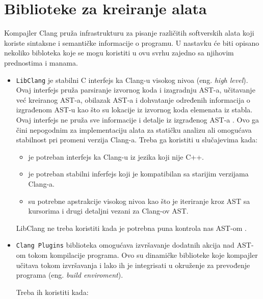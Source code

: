 \documentclass[12pt,oneside]{memoir}
\begin{document}
\section{Biblioteke za kreiranje alata}

 Kompajler Clang pru\v{z}a infrastrukturu za pisanje razli\v{c}itih softverskih alata koji koriste sintaksne i semanti\v{c}ke informacije o programu. U nastavku \'{c}e biti opisano nekoliko bibloteka koje se mogu koristiti u ovu svrhu zajedno sa njihovim prednostima i manama.


\begin{itemize}
\item \lstinline{LibClang} je stabilni C interfejs ka Clang-u visokog nivoa (eng. \textit{high level}). Ovaj interfejs pru\v{z}a parsiranje izvornog koda
i izagradnju AST-a, u\v{c}itavanje ve\'{c} kreiranog AST-a, obilazak AST-a i dohvatanje određenih informacija o izgrađenom AST-u kao \v{s}to su lokacije iz izvornog koda elemenata iz stabla. Ovaj interfejs ne pru\v{z}a sve informacije i detalje iz izgrađenog AST-a \cite{LibClang}. Ovo ga \v{c}ini nepogodnim za implementaciju alata za stati\v{c}ku analizu ali omogu\'{c}ava stabilnost pri promeni verzija Clang-a.
Treba ga koristiti u slu\v{c}ajevima kada:
\begin{itemize}
  \item je potreban interfejs ka Clang-u iz jezika koji nije C++.
  \item je potreban stabilni inferfejs koji je kompatibilan sa starijim verzijama Clang-a.
  \item su potrebne apstrakcije visokog nivoa kao \v{s}to je iteriranje kroz AST sa kursorima i drugi detaljni vezani za Clang-ov AST.
\end{itemize}
LibClang ne treba koristiti kada je potrebna puna kontrola nas AST-om \cite{RightInterface}.

\item \lstinline{Clang Plugins} biblioteka omogu\'{c}ava izvr\v{s}avanje dodatnih akcija nad AST-om tokom kompilacije programa. Ovo su dinami\v{c}ke biblioteke koje kompajler u\v{c}itava tokom izvr\v{s}avanja i lako ih je integrisati u okru\v{z}enje za prevođenje programa (eng. \textit{build enviroment}).

Treba ih koristiti kada:


\end{itemize}
\end{document}
